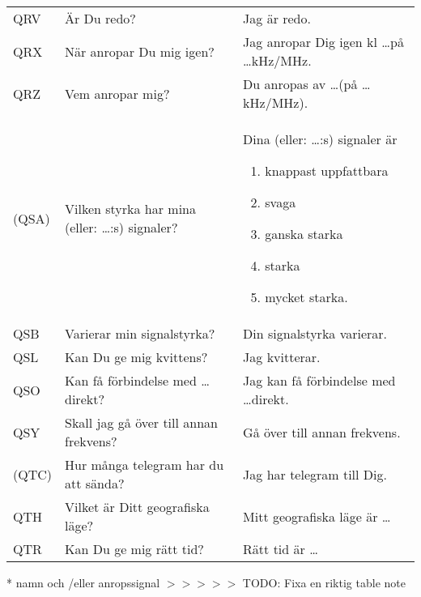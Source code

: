 \begin{table}
\begin{tabular}{lp{6cm}p{6cm}}
    \\
    QRV
    &
    Är Du redo?
    &
    Jag är redo.
    \\
    QRX
    &
    När anropar Du mig igen?
    &
    Jag anropar Dig igen kl \dots på \dots kHz/MHz.
    \\
    QRZ
    &
    Vem anropar mig?
    &
    Du anropas av \dots * (på \dots kHz/MHz).
    \\
    (QSA)
    &
    Vilken styrka har mina
    (eller: \dots *:s) signaler?
    &
    Dina (eller: \dots *:s) signaler är
    \begin{enumerate}
    \item knappast uppfattbara
    \item svaga
    \item ganska starka
    \item starka
    \item mycket starka.
    \end{enumerate}
    \\
    QSB
    &
    Varierar min signalstyrka?
    &
    Din signalstyrka varierar.
    \\
    QSL
    &
    Kan Du ge mig kvittens?
    &
    Jag kvitterar.
    \\
    QSO
    &
    Kan få förbindelse med \dots * direkt?
    &
    Jag kan få förbindelse med \dots * direkt.
    \\
    QSY
    &
    Skall jag gå över till annan frekvens?
    &
    Gå över till annan frekvens.
    \\
    (QTC)
    &
    Hur många telegram har du att sända?
    &
    Jag har telegram till Dig.
    \\
    QTH
    &
    Vilket är Ditt geografiska läge?
    &
    Mitt geografiska läge är \dots
    \\
    QTR
    &
    Kan Du ge mig rätt tid?
    &
    Rätt tid är \dots
    \\
  \end{tabular}
* namn och /eller anropssignal
$>>>>>$ TODO: Fixa en riktig table note
\end{table}
